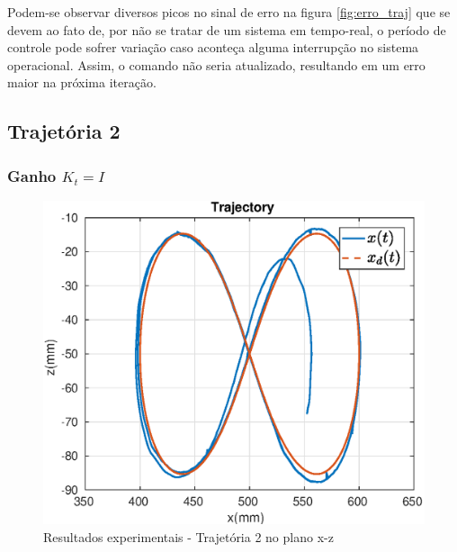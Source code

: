 Podem-se observar diversos picos no sinal de erro na figura \ref{fig:erro_traj} que se devem ao fato de, por não se tratar de um sistema em tempo-real, o período de controle pode sofrer variação caso aconteça alguma interrupção no sistema operacional. Assim, o comando não seria atualizado, resultando em um erro maior na próxima iteração.


\subsection{Trajetória 2}

\subsubsection{Ganho ${K}_t = {I}$}
\begin{figure}[H]
\centering
  \includegraphics[width=0.5\linewidth]{./img/traj_2_k1/traj.eps}
  \caption{Resultados experimentais - Trajetória 2 no plano x-z}
  \label{fig:sub1}
\end{figure}%


